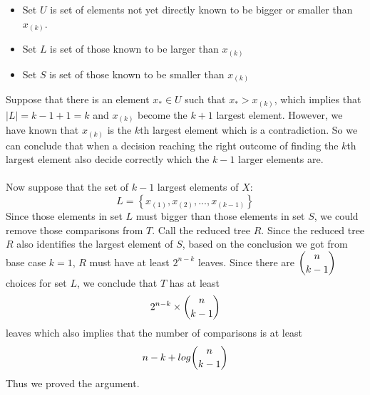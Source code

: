 \begin{itemize}
	\item Set $U$ is set of elements not yet directly known to be bigger or smaller than $x_{(k)}$.
	\item Set $L$ is set of those known to be larger than $x_{(k)}$
	\item Set $S$ is set of those known to be smaller than $x_{(k)}$
\end{itemize}
Suppose that there is an element $x_* \in U$ such that $x_* > x_{(k)}$, which implies that $\mid L \mid = k - 1 + 1 = k$ and $x_{(k)}$ become the $k + 1$ largest element. However, we have known that $x_{(k)}$ is the $k$th largest element which is a contradiction. So we can conclude that when a decision reaching the right outcome of finding the $k$th largest element also decide correctly which the $k - 1$ larger elements are.\\\\
Now suppose that the set of $k - 1$ largest elements of $X$:
$$ L = \left\{x_{(1)}, x_{(2)}, ... ,x_{(k-1)}\right\} $$  
Since those elements in set $L$ must bigger than those elements in set $S$, we could remove those comparisons from $T$. Call the reduced tree $R$. Since the reduced tree $R$ also identifies the largest element of $S$, based on the conclusion we got from base case $k = 1$, $R$ must have at least $2^{n - k}$ leaves. Since there are $\dbinom{n}{k - 1}$ choices for set $L$, we conclude that $T$ has at least
$$2^{n - k} \times \dbinom{n}{k - 1}$$
 leaves which also implies that the number of comparisons is at least
 $$n - k + log\dbinom{n}{k - 1}$$ 
 Thus we proved the argument.  







